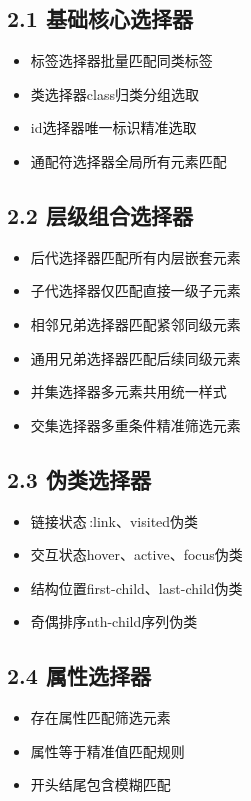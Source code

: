 \subsection{2.1 基础核心选择器}
\begin{itemize}[leftmargin=*]
\item 标签选择器批量匹配同类标签
\item 类选择器class归类分组选取
\item id选择器唯一标识精准选取
\item 通配符选择器全局所有元素匹配
\end{itemize}

\subsection{2.2 层级组合选择器}
\begin{itemize}[leftmargin=*]
\item 后代选择器匹配所有内层嵌套元素
\item 子代选择器仅匹配直接一级子元素
\item 相邻兄弟选择器匹配紧邻同级元素
\item 通用兄弟选择器匹配后续同级元素
\item 并集选择器多元素共用统一样式
\item 交集选择器多重条件精准筛选元素
\end{itemize}

\subsection{2.3 伪类选择器}
\begin{itemize}[leftmargin=*]
\item 链接状态\,:link、\:visited伪类
\item 交互状态\:hover、\:active、\:focus伪类
\item 结构位置\:first-child、\:last-child伪类
\item 奇偶排序\:nth-child序列伪类
\end{itemize}

\subsection{2.4 属性选择器}
\begin{itemize}[leftmargin=*]
\item 存在属性匹配筛选元素
\item 属性等于精准值匹配规则
\item 开头结尾包含模糊匹配
\end{itemize}

